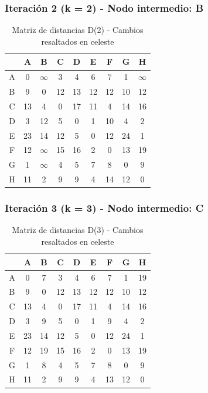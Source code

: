 \documentclass[12pt]{article}
\begin{document}
\subsubsection{Iteración 2 (k = 2) - Nodo intermedio: B}
\begin{table}[h!]
\centering
\begin{tabular}{|c|c|c|c|c|c|c|c|c|}
\hline
 & A & B & C & D & E & F & G & H \\\hline
A & 0 & $\infty$ & 3 & 4 & 6 & 7 & 1 & $\infty$ \\\hline
B & 9 & 0 & 12 & 13 & 12 & 12 & 10 & 12 \\\hline
C & \cellcolor{lightgreen} 13 & 4 & 0 & \cellcolor{lightgreen} 17 & 11 & 4 & \cellcolor{lightgreen} 14 & \cellcolor{lightgreen} 16 \\\hline
D & 3 & 12 & 5 & 0 & 1 & 10 & 4 & 2 \\\hline
E & \cellcolor{lightgreen} 23 & 14 & 12 & 5 & 0 & 12 & \cellcolor{lightgreen} 24 & 1 \\\hline
F & 12 & $\infty$ & 15 & 16 & 2 & 0 & 13 & 19 \\\hline
G & 1 & $\infty$ & 4 & 5 & 7 & 8 & 0 & 9 \\\hline
H & \cellcolor{lightgreen} 11 & 2 & 9 & 9 & 4 & \cellcolor{lightgreen} 14 & \cellcolor{lightgreen} 12 & 0 \\\hline
\end{tabular}
\caption{Matriz de distancias D(2) - Cambios resaltados en celeste}
\end{table}

\subsubsection{Iteración 3 (k = 3) - Nodo intermedio: C}
\begin{table}[h!]
\centering
\begin{tabular}{|c|c|c|c|c|c|c|c|c|}
\hline
 & A & B & C & D & E & F & G & H \\\hline
A & 0 & \cellcolor{lightgreen} 7 & 3 & 4 & 6 & 7 & 1 & \cellcolor{lightgreen} 19 \\\hline
B & 9 & 0 & 12 & 13 & 12 & 12 & 10 & 12 \\\hline
C & 13 & 4 & 0 & 17 & 11 & 4 & 14 & 16 \\\hline
D & 3 & \cellcolor{lightgreen} 9 & 5 & 0 & 1 & \cellcolor{lightgreen} 9 & 4 & 2 \\\hline
E & 23 & 14 & 12 & 5 & 0 & 12 & 24 & 1 \\\hline
F & 12 & \cellcolor{lightgreen} 19 & 15 & 16 & 2 & 0 & 13 & 19 \\\hline
G & 1 & \cellcolor{lightgreen} 8 & 4 & 5 & 7 & 8 & 0 & 9 \\\hline
H & 11 & 2 & 9 & 9 & 4 & \cellcolor{lightgreen} 13 & 12 & 0 \\\hline
\end{tabular}
\caption{Matriz de distancias D(3) - Cambios resaltados en celeste}
\end{table}
\end{document}
